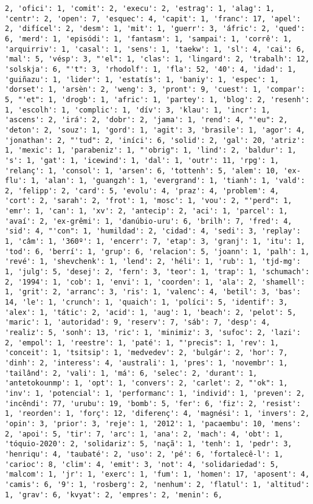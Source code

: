 \documentclass[11pt]{article}
\begin{document}
\begin{Verbatim}[commandchars=\\\{\}]
2, 'ofici': 1, 'comit': 2, 'execu': 2, 'estrag': 1, 'alag': 1, 'centr': 2, 'open': 7, 'esquec': 4, 'capit': 1, 'franc': 17, 'apel': 2, 'difícel': 2, 'desm': 1, 'mit': 1, 'guerr': 3, 'áfric': 2, 'qued': 6, 'merd': 1, 'episódi': 1, 'fantasm': 1, 'sampai': 1, 'corrê': 1, 'arquirriv': 1, 'casal': 1, 'sens': 1, 'taekw': 1, 'sl': 4, 'cai': 6, 'mal': 5, 'vésp': 3, "'el": 1, 'clas': 1, 'lingard': 2, 'trabalh': 12, 'solskja': 6, "'t": 3, 'rhodolf': 1, 'fla': 52, '40': 4, 'idad': 1, 'guiñazu': 1, 'lider': 1, 'estatís': 1, 'baniy': 1, 'espec': 1, 'dorset': 1, 'arsèn': 2, 'weng': 3, 'pront': 9, 'cuest': 1, 'compar': 5, "'et": 1, 'drogb': 1, 'afric': 1, 'partey': 1, 'blog': 2, 'resenh': 1, 'escolh': 1, 'complic': 1, 'dív': 3, 'klau': 1, 'incr': 1, 'ascens': 2, 'irá': 2, 'dobr': 2, 'jama': 1, 'rend': 4, "'eu": 2, 'deton': 2, 'souz': 1, 'gord': 1, 'agit': 3, 'brasile': 1, 'agor': 4, 'jonathan': 2, "'tud": 2, 'iníci': 6, 'solid': 2, 'gal': 20, 'atriz': 1, 'mexic': 1, 'parabeniz': 1, "'obrig": 1, 'lind': 2, 'baldur': 1, 's': 1, 'gat': 1, 'icewind': 1, 'dal': 1, 'outr': 11, 'rpg': 1, 'relanç': 1, 'consol': 1, 'arsen': 6, 'tottenh': 5, 'alem': 10, 'ex-flu': 1, 'alan': 1, 'guangzh': 1, 'evergrand': 1, 'tianh': 1, 'vald': 2, 'felipp': 2, 'card': 5, 'evolu': 4, 'praz': 4, 'problem': 4, 'cort': 2, 'sarah': 2, 'frot': 1, 'mosc': 1, 'vou': 2, "'perd": 1, 'emr': 1, 'can': 1, 'xv': 2, 'antecip': 2, 'aci': 1, 'parcel': 1, 'avaí': 2, 'ex-grêmi': 1, 'danúbio-uru': 6, 'brilh': 7, 'fred': 4, 'sid': 4, "'con": 1, 'humildad': 2, 'cidad': 4, 'sedi': 3, 'replay': 1, 'câm': 1, '360º': 1, 'encerr': 7, 'etap': 3, 'granj': 1, 'itu': 1, 'tod': 6, 'berrí': 1, 'grup': 6, 'relacion': 5, 'joann': 1, 'palh': 1, 'revé': 1, 'shevchenk': 1, 'lend': 2, 'héli': 1, 'rub': 1, 'tjd-mg': 1, 'julg': 5, 'desej': 2, 'fern': 3, 'teor': 1, 'trap': 1, 'schumach': 2, '1994': 1, 'cob': 1, 'envi': 1, 'coorden': 1, 'ala': 2, 'shamell': 1, 'grit': 2, 'arranc': 3, 'ris': 1, 'valenc': 4, 'betil': 3, 'bas': 14, 'le': 1, 'crunch': 1, 'quaich': 1, 'políci': 5, 'identif': 3, 'alex': 1, 'tátic': 2, 'acid': 1, 'aug': 1, 'beach': 2, 'pelot': 5, 'maric': 1, 'autoridad': 9, 'reserv': 7, 'sáb': 7, 'desp': 4, 'realiz': 5, 'sonh': 13, 'ric': 1, 'minimiz': 3, 'sufoc': 2, 'lazi': 2, 'empol': 1, 'reestre': 1, 'paté': 1, "'precis": 1, 'rev': 1, 'conceit': 1, 'tsitsip': 1, 'medvedev': 2, 'bulgár': 2, 'hor': 7, 'dinh': 2, 'interess': 4, 'australi': 1, 'pres': 1, 'novembr': 1, 'tailând': 2, 'vali': 1, 'má': 6, 'selec': 2, 'durant': 1, 'antetokounmp': 1, 'opt': 1, 'convers': 2, 'carlet': 2, "'ok": 1, 'inv': 1, 'potencial': 1, 'performanc': 1, 'individ': 1, 'preven': 2, 'incêndi': 77, 'urubu': 19, 'bomb': 5, 'fer': 6, 'fiz': 2, 'resist': 1, 'reorden': 1, 'forç': 12, 'diferenç': 4, 'magnési': 1, 'invers': 2, 'opin': 3, 'prior': 3, 'reje': 1, '2012': 1, 'pacaembu': 10, 'mens': 2, 'apoi': 5, 'tir': 7, 'arc': 1, 'ana': 2, 'mach': 4, 'obt': 1, 'tóquio-2020': 2, 'solidariz': 5, 'naçã': 1, 'tenh': 1, 'pedr': 3, 'henriqu': 4, 'taubaté': 2, 'uso': 2, 'pé': 6, 'fortalecê-l': 1, 'carioc': 8, 'clim': 4, 'emit': 3, 'not': 4, 'solidariedad': 5, 'malcom': 1, 'jr': 1, 'exerc': 1, 'fum': 1, 'homen': 17, 'aposent': 4, 'camis': 6, '9': 1, 'rosberg': 2, 'nenhum': 2, 'flatul': 1, 'altitud': 1, 'grav': 6, 'kvyat': 2, 'empres': 2, 'menin': 6, 
\end{Verbatim}
\end{document}
